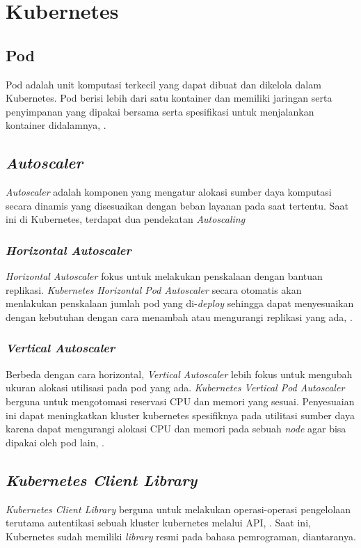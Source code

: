 \section{Kubernetes}

\subsection{Pod}
Pod adalah unit komputasi terkecil yang dapat dibuat dan dikelola dalam Kubernetes. Pod berisi lebih dari satu kontainer dan memiliki jaringan serta penyimpanan yang dipakai bersama serta spesifikasi untuk menjalankan kontainer didalamnya, \parencite{pod}.

\subsection{\textit{Autoscaler}}
\textit{Autoscaler} adalah komponen yang mengatur alokasi sumber daya komputasi secara dinamis yang disesuaikan dengan beban layanan pada saat tertentu. Saat ini di Kubernetes, terdapat dua pendekatan \textit{Autoscaling} 

\subsubsection{\textit{Horizontal Autoscaler}}
\textit{Horizontal Autoscaler} fokus untuk melakukan penskalaan dengan bantuan replikasi. \textit{Kubernetes Horizontal Pod Autoscaler} secara otomatis akan menlakukan penskalaan jumlah pod yang di-\textit{deploy} sehingga dapat menyesuaikan dengan kebutuhan dengan cara menambah atau mengurangi replikasi yang ada, \parencite{hpa}. 

\subsubsection{\textit{Vertical Autoscaler}}
Berbeda dengan cara horizontal, \textit{Vertical Autoscaler} lebih fokus untuk mengubah ukuran alokasi utilisasi pada pod yang ada. \textit{Kubernetes Vertical Pod Autoscaler} berguna untuk mengotomasi reservasi CPU dan memori yang sesuai. Penyesuaian ini dapat meningkatkan kluster kubernetes spesifiknya pada utilitasi sumber daya karena dapat mengurangi alokasi CPU dan memori pada sebuah \textit{node} agar bisa dipakai oleh pod lain, \parencite{vpa2}.

\subsection{\textit{Kubernetes Client Library}}
\textit{Kubernetes Client Library} berguna untuk melakukan operasi-operasi pengelolaan terutama autentikasi sebuah kluster kubernetes melalui API, \parencite{clientlibrary}. Saat ini, Kubernetes sudah memiliki \textit{library} resmi pada bahasa pemrograman, diantaranya.

